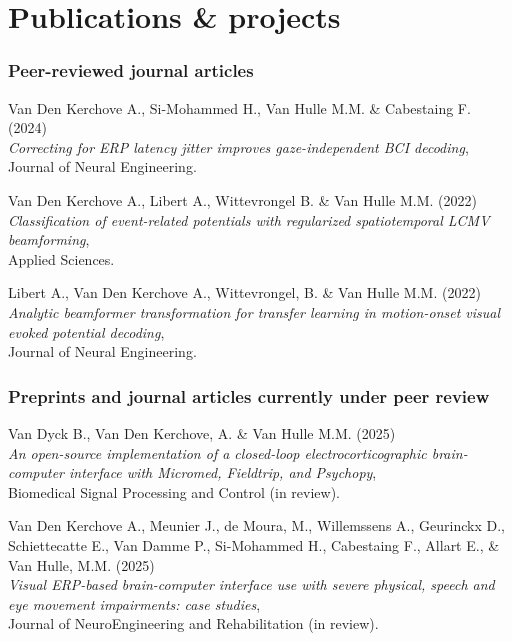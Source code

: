 \documentclass{resume}
\begin{document}
\section*{Publications \& projects}


\subsubsection*{Peer-reviewed journal articles}
\begin{description}
	\item  Van Den Kerchove A., Si-Mohammed H., Van Hulle M.M. \& Cabestaing F. (2024) \\
	      \emph{Correcting for ERP latency jitter improves gaze-independent BCI decoding}, \\
	      Journal of Neural Engineering.
	\item Van Den Kerchove A., Libert A., Wittevrongel B. \& Van Hulle M.M.  (2022) \\
	      \emph{Classification of event-related potentials with regularized spatiotemporal LCMV beamforming}, \\
	      Applied Sciences.
	\item Libert A., Van Den Kerchove A., Wittevrongel, B. \& Van Hulle M.M. (2022) \\
	      \emph{Analytic beamformer transformation for transfer learning in motion-onset visual evoked potential decoding}, \\
	      Journal of Neural Engineering.
\end{description}

\subsubsection*{Preprints and journal articles currently under peer review}
\begin{description}
	\item Van Dyck B., Van Den Kerchove, A. \& Van Hulle M.M. (2025)\\
	      \emph{An open-source implementation of a closed-loop electrocorticographic
		      brain-computer interface with Micromed, Fieldtrip, and Psychopy}, \\
	      Biomedical Signal Processing and Control (in review).
	\item Van Den Kerchove A., Meunier J., de Moura, M., Willemssens A., Geurinckx D., Schiettecatte E., Van Damme P., Si-Mohammed H., Cabestaing F., Allart E., \& Van Hulle, M.M. (2025)\\
	      \emph{Visual ERP-based brain-computer interface use with severe physical, speech and eye movement impairments: case studies}, \\
	      Journal of NeuroEngineering and Rehabilitation (in review).
\end{description}
\end{document}
